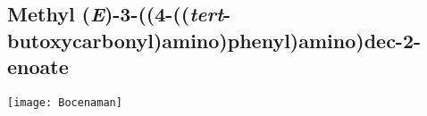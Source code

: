 %
%

\subsection{Methyl (\textit{E})-3-((4-((\textit{tert}-butoxycarbonyl)amino)phenyl)amino)dec-2-enoate }


\begin{scheme}[H]
	\begin{center}
		\texttt{[image: Bocenaman]}
	\end{center}
\end{scheme}

